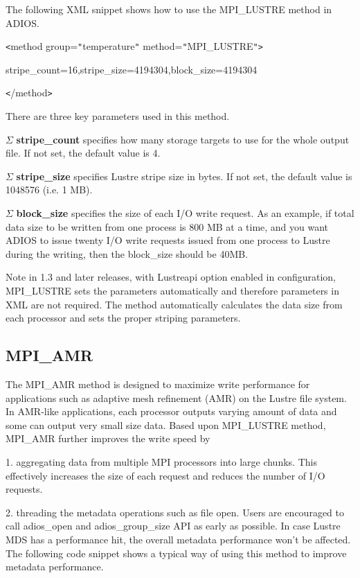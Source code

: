 The following XML snippet shows how to use the MPI\_LUSTRE method in ADIOS. 

\texttt{<}method group=\texttt{"}temperature\texttt{"} method=\texttt{"}MPI\_LUSTRE\texttt{"}\texttt{>}

\parindent=14pt
stripe\_count=16,stripe\_size=4194304,block\_size=4194304

\parindent=0pt
\texttt{<}/method\texttt{>}

There are three key parameters used in this method.

\ensuremath{\Sigma} \textbf{stripe\_count} specifies how many storage targets to 
use for the whole output file. If not set, the default value is 4.

\ensuremath{\Sigma} \textbf{stripe\_size}  specifies Lustre stripe size in bytes. 
If not set, the default value is 1048576 (i.e. 1 MB).

\ensuremath{\Sigma} \textbf{block\_size}   specifies the size of each I/O write 
request. As an example, if total data size to be written from one process is 800 
MB at a time, and you want ADIOS to issue twenty I/O write requests issued from 
one process to Lustre during the writing, then the block\_size should be 40MB.

Note in 1.3 and later releases, with Lustreapi option enabled in configuration, 
MPI\_LUSTRE sets the parameters automatically and therefore parameters in XML are 
not required.  The method automatically calculates the data size from each processor 
and sets the proper striping parameters. \label{HRef278374093}\label{HToc182553385}

\subsection{MPI\_AMR}
\label{section-method-mpiamr}

The MPI\_AMR method is designed to maximize write performance for applications 
such as adaptive mesh refinement (AMR) on the Lustre file system. In AMR-like applications, 
each processor outputs varying amount of data and some can output very small size 
data. Based upon MPI\_LUSTRE method, MPI\_AMR further improves the write speed 
by 

1. aggregating data from multiple MPI processors into large chunks. This effectively 
increases the size of each request and reduces the number of I/O requests.

2. threading the metadata operations such as file open. Users are encouraged to 
call adios\_open and adios\_group\_size API as early as possible. In case Lustre 
MDS has a performance hit, the overall metadata performance won't be affected. 
The following code snippet shows a typical way of using this method to improve 
metadata performance.

